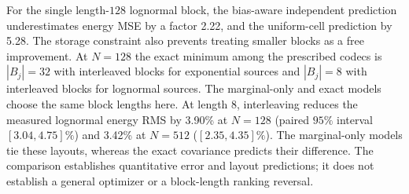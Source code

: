 For the single length-$128$ lognormal block, the bias-aware independent
prediction underestimates energy MSE by a factor 2.22, and the
uniform-cell prediction by 5.28. The storage constraint also
prevents treating smaller blocks as a free improvement. At $N=128$ the exact
minimum among the prescribed codecs is $|B_j|=32$ with interleaved blocks for exponential sources
and $|B_j|=8$ with interleaved blocks for lognormal sources. The marginal-only and exact models
choose the same block lengths here. At length $8$, interleaving reduces the
measured lognormal energy RMS by 3.90\% at $N=128$ (paired $95\%$
interval $[3.04,4.75]\%$) and 3.42\% at $N=512$
($[2.35,4.35]\%$). The marginal-only models tie these
layouts, whereas the exact covariance predicts their difference.
The comparison establishes quantitative error and layout predictions; it
does not establish a general optimizer or a block-length ranking reversal.
